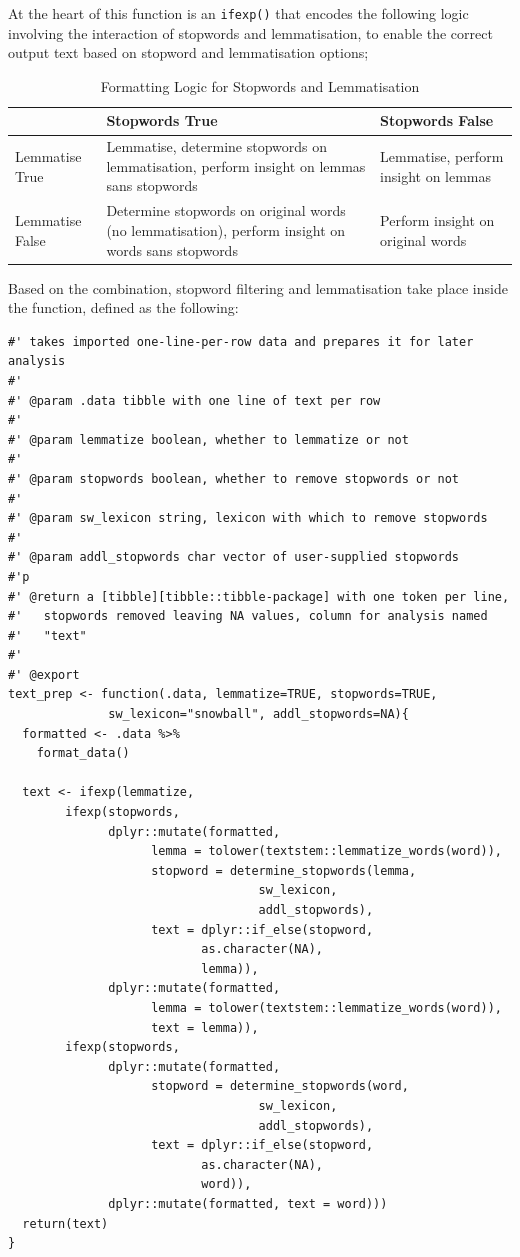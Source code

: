 \documentclass[11pt, a4paper, oneside]{report}
\begin{document}
At the heart of this function is an \texttt{ifexp()} that
encodes the following logic involving the interaction of stopwords and
lemmatisation, to enable the correct output text based on stopword and lemmatisation options;

\begin{table}[h]
  \centering
  \begin{tabular}{p{20mm}|p{50mm}p{50mm}}
  & Stopwords True & Stopwords False\\
  \toprule
Lemmatise True & Lemmatise, determine stopwords on lemmatisation, perform insight on lemmas sans stopwords & Lemmatise, perform insight on lemmas\\
Lemmatise False & Determine stopwords on original words (no lemmatisation), perform insight on words sans stopwords & Perform insight on original words\\
\end{tabular}

\caption{Formatting Logic for Stopwords and Lemmatisation}\label{tab:formatting}
\end{table}



Based on the combination, stopword filtering and lemmatisation take
place inside the function, defined as the following:

\begin{verbatim}
#' takes imported one-line-per-row data and prepares it for later analysis
#'
#' @param .data tibble with one line of text per row
#'
#' @param lemmatize boolean, whether to lemmatize or not
#'
#' @param stopwords boolean, whether to remove stopwords or not
#'
#' @param sw_lexicon string, lexicon with which to remove stopwords
#'
#' @param addl_stopwords char vector of user-supplied stopwords
#'p
#' @return a [tibble][tibble::tibble-package] with one token per line,
#'   stopwords removed leaving NA values, column for analysis named
#'   "text"
#'
#' @export
text_prep <- function(.data, lemmatize=TRUE, stopwords=TRUE,
		      sw_lexicon="snowball", addl_stopwords=NA){
  formatted <- .data %>%
    format_data()

  text <- ifexp(lemmatize,
		ifexp(stopwords,
		      dplyr::mutate(formatted,
				    lemma = tolower(textstem::lemmatize_words(word)),
				    stopword = determine_stopwords(lemma,
								   sw_lexicon,
								   addl_stopwords),
				    text = dplyr::if_else(stopword,
						   as.character(NA),
						   lemma)),
		      dplyr::mutate(formatted,
				    lemma = tolower(textstem::lemmatize_words(word)),
				    text = lemma)),
		ifexp(stopwords,
		      dplyr::mutate(formatted,
				    stopword = determine_stopwords(word,
								   sw_lexicon,
								   addl_stopwords),
				    text = dplyr::if_else(stopword,
						   as.character(NA),
						   word)),
		      dplyr::mutate(formatted, text = word)))
  return(text)
}
\end{verbatim}
\end{document}

